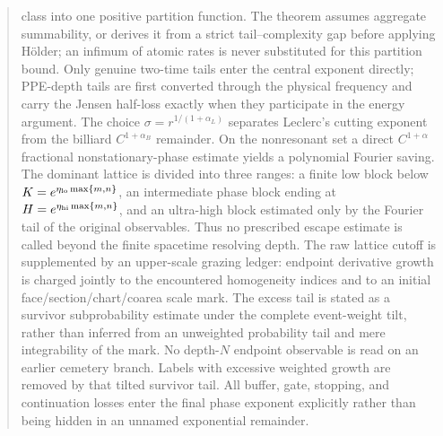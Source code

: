 \documentclass[11pt]{article}
\begin{document}
\begin{abstract}
class into one positive partition function.  The theorem assumes aggregate
summability, or derives it from a strict tail--complexity gap before applying
H\"older; an infimum of atomic rates is never substituted for this partition
bound.  Only genuine two-time tails enter the central exponent directly;
PPE-depth tails are first converted through the physical frequency and carry
the Jensen half-loss exactly when they participate in the energy argument.  The
choice $\sigma=r^{1/(1+\alpha_L)}$ separates Leclerc's cutting exponent from
the billiard $C^{1+\alpha_B}$ remainder.  On the nonresonant set a direct
$C^{1+\alpha}$ fractional nonstationary-phase estimate yields a polynomial
Fourier saving.  The dominant lattice is divided into three ranges: a finite
low block below $K=e^{\eta_{\rm lo}\max\{m,n\}}$, an intermediate phase block
ending at $H=e^{\eta_{\rm hi}\max\{m,n\}}$, and an ultra-high block estimated
only by the Fourier tail of the original observables.  Thus no prescribed
escape estimate is called beyond the finite spacetime resolving depth.  The
raw lattice cutoff is supplemented by an upper-scale grazing ledger: endpoint
derivative growth is charged jointly to the encountered homogeneity indices
and to an initial face/section/chart/coarea scale mark.  The excess tail is
stated as a survivor subprobability estimate under the complete event-weight
tilt, rather than inferred from an unweighted probability tail and mere
integrability of the mark.  No depth-$N$ endpoint observable is read on an
earlier cemetery branch.  Labels with excessive weighted growth are removed
by that tilted survivor tail.  All
buffer, gate, stopping, and continuation losses enter the final phase exponent
explicitly rather than being hidden in an unnamed exponential remainder.


\end{abstract}
\end{document}
